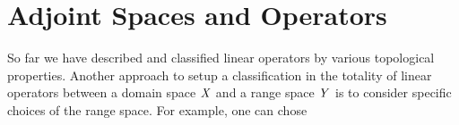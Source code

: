 \documentclass[11pt,twoside]{article}
\begin{document}
\section{Adjoint Spaces and Operators}                                         %
So far we have described and classified linear operators
by various topological properties.
Another approach to setup a classification
in the totality of linear operators between a domain space $\mathit{X}$
and a range space $\mathit{Y}$ is to consider specific choices of the range space.
For example,
one can chose
\end{document}
